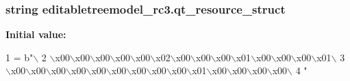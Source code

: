 \subsubsection[{qt\+\_\+resource\+\_\+struct}]{\setlength{\rightskip}{0pt plus 5cm}string editabletreemodel\+\_\+rc3.\+qt\+\_\+resource\+\_\+struct}\label{namespaceeditabletreemodel__rc3_a508b1c89345f713fb75d227702a0f935}
{\bfseries Initial value\+:}
\begin{DoxyCode}
1 = b\textcolor{stringliteral}{"\(\backslash\)}
2 \textcolor{stringliteral}{\(\backslash\)x00\(\backslash\)x00\(\backslash\)x00\(\backslash\)x00\(\backslash\)x00\(\backslash\)x02\(\backslash\)x00\(\backslash\)x00\(\backslash\)x00\(\backslash\)x01\(\backslash\)x00\(\backslash\)x00\(\backslash\)x00\(\backslash\)x01\(\backslash\)}
3 \textcolor{stringliteral}{\(\backslash\)x00\(\backslash\)x00\(\backslash\)x00\(\backslash\)x00\(\backslash\)x00\(\backslash\)x00\(\backslash\)x00\(\backslash\)x00\(\backslash\)x00\(\backslash\)x01\(\backslash\)x00\(\backslash\)x00\(\backslash\)x00\(\backslash\)x00\(\backslash\)}
4 \textcolor{stringliteral}{"}
\end{DoxyCode}

